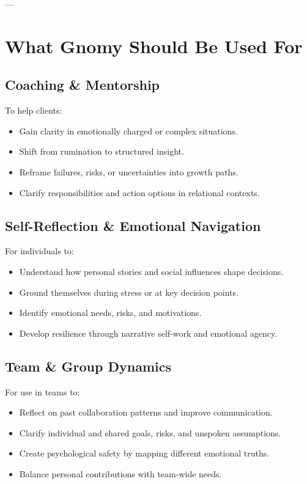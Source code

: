 \documentclass{article}
\begin{document}
---

\section{What Gnomy Should Be Used For}

\subsection{Coaching \& Mentorship}
To help clients:
\begin{itemize}[noitemsep,topsep=0pt]
    \item Gain clarity in emotionally charged or complex situations.
    \item Shift from rumination to structured insight.
    \item Reframe failures, risks, or uncertainties into growth paths.
    \item Clarify responsibilities and action options in relational contexts.
\end{itemize}

\subsection{Self-Reflection \& Emotional Navigation}
For individuals to:
\begin{itemize}[noitemsep,topsep=0pt]
    \item Understand how personal stories and social influences shape decisions.
    \item Ground themselves during stress or at key decision points.
    \item Identify emotional needs, risks, and motivations.
    \item Develop resilience through narrative self-work and emotional agency.
\end{itemize}

\subsection{Team \& Group Dynamics}
For use in teams to:
\begin{itemize}[noitemsep,topsep=0pt]
    \item Reflect on past collaboration patterns and improve communication.
    \item Clarify individual and shared goals, risks, and unspoken assumptions.
    \item Create psychological safety by mapping different emotional truths.
    \item Balance personal contributions with team-wide needs.
\end{itemize}
\end{document}
